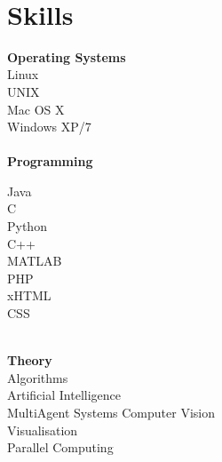 \documentclass[10pt, a4paper]{report}
\newcommand{\engineering}[1]{}
\renewcommand{\engineering}[1]{#1}
\begin{document}
\hfill
\begin{minipage}[t]{12em}
\begin{flushright}
~\\
\section*{Skills}

\engineering{
{\bf Operating Systems} \\
Linux \\
UNIX \\
Mac OS X \\
Windows XP/7 \\
~\\

{\bf Programming}

Java \\
C \\
Python \\

C++ \\
MATLAB \\
PHP \\
xHTML \\
CSS
%

~\\

{\bf Theory} \\
Algorithms \\
Artificial Intelligence \\
Multi\-Agent Systems
Computer Vision \\
Visualisation \\
Parallel Computing

~\\


}
\end{flushright}
\end{minipage}
\end{document}
